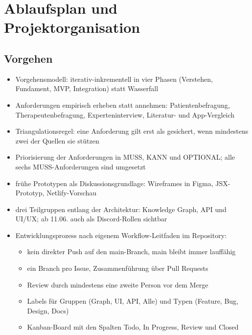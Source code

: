 \section{Ablaufsplan und Projektorganisation}
\subsection{Vorgehen}


\begin{itemize}
    \item Vorgehensmodell: iterativ-inkrementell in vier Phasen (Verstehen, Fundament, MVP, Integration) statt Wasserfall \autocite{larman2003iterative,sommerville2016software}
    \item Anforderungen empirisch erheben statt annehmen: Patientenbefragung, Therapeutenbefragung, Experteninterview, Literatur- und App-Vergleich \autocite{pohl2010requirements}
    \item Triangulationsregel: eine Anforderung gilt erst als gesichert, wenn mindestens zwei der Quellen sie stützen \autocite{flick2011triangulation}
    \item Priorisierung der Anforderungen in MUSS, KANN und OPTIONAL; alle sechs MUSS-Anforderungen sind umgesetzt
    \item frühe Prototypen als Diskussionsgrundlage: Wireframes in Figma, JSX-Prototyp, Netlify-Vorschau
    \item drei Teilgruppen entlang der Architektur: Knowledge Graph, API und UI/UX; ab 11.06. auch als Discord-Rollen sichtbar
    \item Entwicklungsprozess nach eigenem Workflow-Leitfaden im Repository:
    \begin{itemize}
        \item kein direkter Push auf den main-Branch, main bleibt immer lauffähig
        \item ein Branch pro Issue, Zusammenführung über Pull Requests \autocite{chacon2014progit}
        \item Review durch mindestens eine zweite Person vor dem Merge
        \item Labels für Gruppen (Graph, UI, API, Alle) und Typen (Feature, Bug, Design, Docs)
        \item Kanban-Board mit den Spalten Todo, In Progress, Review und Closed \autocite{anderson2010kanban}

\end{itemize}
\end{itemize}
